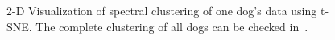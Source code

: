 





\begin{figure}[th]
\centering
{}
\caption{2-D Visualization of spectral clustering of one dog's data using t-SNE. 
The complete clustering of all dogs can be checked in~.}
\label{fig:visualizationcluster}
\end{figure}


